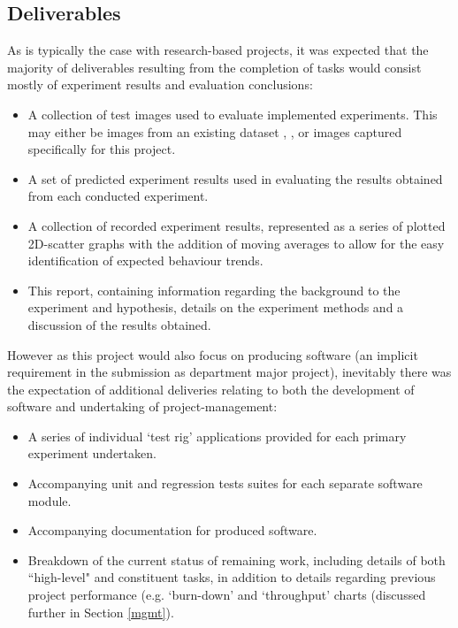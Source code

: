 \subsection{Deliverables}

As is typically the case with research-based projects, it was expected that the majority of deliverables resulting from the completion of tasks would consist mostly of experiment results and evaluation conclusions:

\begin{itemize}
	\item A collection of test images used to evaluate implemented experiments. This may either be images from an existing dataset \cite{ucl-dataset} \cite{baker-dataset}, \cite{mpi-dataset}, or images captured specifically for this project.
	\item A set of predicted experiment results used in evaluating the results obtained from each conducted experiment.
	\item A collection of recorded experiment results, represented as a series of plotted 2D-scatter graphs with the addition of moving averages to allow for the easy identification of expected behaviour trends.
	\item This report, containing information regarding the background to the experiment and hypothesis, details on the experiment methods and a discussion of the results obtained.
 \end{itemize}

However as this project would also focus on producing software (an implicit requirement in the submission as department major project), inevitably there was the expectation of additional deliveries relating to both the development of software and undertaking of project-management:

\begin{itemize}
	\item A series of individual `test rig' applications provided for each primary experiment undertaken.
	\item Accompanying unit and regression tests suites for each separate software module.
	\item Accompanying documentation for produced software.
	\item Breakdown of the current status of remaining work, including details of both ``high-level" and constituent tasks, in addition to details regarding previous project performance (e.g. `burn-down' and `throughput' charts (discussed further in Section \ref{mgmt}).
\end{itemize}
  

